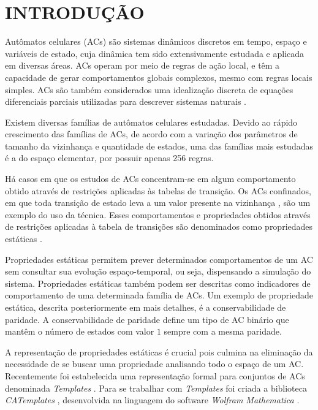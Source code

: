 \section{INTRODUÇÃO}
\label{sec:introducao}

Autômatos celulares (ACs) são sistemas dinâmicos discretos em tempo, espaço e variáveis de estado, cuja dinâmica tem sido extensivamente estudada e aplicada em diversas áreas. %
ACs operam por meio de regras de ação local, e têm a capacidade de gerar comportamentos globais complexos, mesmo com regras locais simples. %
ACs são também considerados uma idealização discreta de equações diferenciais parciais utilizadas para descrever sistemas naturais \cite{wolfram1994cellular}.

Existem diversas famílias de autômatos celulares estudadas. Devido ao rápido crescimento das famílias de ACs, de acordo com a variação dos parâmetros de tamanho da vizinhança e quantidade de estados, uma das famílias mais estudadas é a do espaço elementar, por possuir apenas 256 regras.

Há casos em que os estudos de ACs concentram-se em algum comportamento obtido através de restrições aplicadas às tabelas de transição. Os ACs confinados, em que toda transição de estado leva a um valor presente na vizinhança \cite{theyssier2004captive}, são um exemplo do uso da técnica. Esses comportamentos e propriedades obtidos através de restrições aplicadas à tabela de transições são denominados como propriedades estáticas \cite{Verardo2014}.

Propriedades estáticas permitem prever determinados comportamentos de um AC sem consultar sua evolução espaço-temporal, ou seja, dispensando a simulação do sistema. Propriedades estáticas também podem ser descritas como indicadores de comportamento de uma determinada família de ACs. Um exemplo de propriedade estática, descrita posteriormente em mais detalhes, é a conservabilidade de paridade. A conservabilidade de paridade define um tipo de AC binário que mantêm o número de estados com valor $1$ sempre com a mesma paridade.%

A representação de propriedades estáticas é crucial pois culmina na eliminação da necessidade de se buscar uma propriedade analisando todo o espaço de um AC. Recentemente foi estabelecida uma representação formal para conjuntos de ACs denominada \textit{Templates} \cite{deOliveira2014,deOliveira2014b}. Para se trabalhar com  \textit{Templates} foi criada a biblioteca \textit{CATemplates} \cite{CATemplates}, desenvolvida na linguagem do software \textit{Wolfram Mathematica} \cite{woframMathematica10}.

